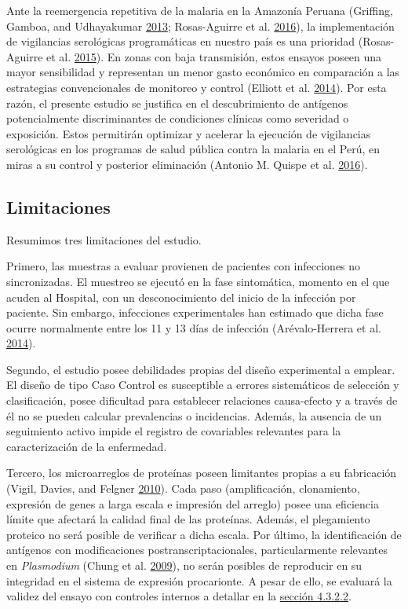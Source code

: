 \documentclass[a4paper]{article}
\begin{document}
Ante la reemergencia repetitiva de la malaria en la Amazonía Peruana
(Griffing, Gamboa, and Udhayakumar
\protect\hyperlink{ref-griffing2013history}{2013}; Rosas-Aguirre et al.
\protect\hyperlink{ref-rosas2016peru}{2016}), la implementación de
vigilancias serológicas programáticas en nuestro país es una prioridad
(Rosas-Aguirre et al. \protect\hyperlink{ref-hotspots2015}{2015}). En
zonas con baja transmisión, estos ensayos poseen una mayor sensibilidad
y representan un menor gasto económico en comparación a las estrategias
convencionales de monitoreo y control (Elliott et al.
\protect\hyperlink{ref-elliott2014}{2014}). Por esta razón, el presente
estudio se justifica en el descubrimiento de antígenos potencialmente
discriminantes de condiciones clínicas como severidad o exposición.
Estos permitirán optimizar y acelerar la ejecución de vigilancias
serológicas en los programas de salud pública contra la malaria en el
Perú, en miras a su control y posterior eliminación (Antonio M. Quispe
et al. \protect\hyperlink{ref-accelerate2016}{2016}).

\subsection{Limitaciones}\label{limit}

Resumimos tres limitaciones del estudio.

Primero, las muestras a evaluar provienen de pacientes con infecciones
no sincronizadas. El muestreo se ejecutó en la fase sintomática, momento
en el que acuden al Hospital, con un desconocimiento del inicio de la
infección por paciente. Sin embargo, infecciones experimentales han
estimado que dicha fase ocurre normalmente entre los 11 y 13 días de
infección (Arévalo-Herrera et al.
\protect\hyperlink{ref-arevalo2014}{2014}).

Segundo, el estudio posee debilidades propias del diseño experimental a
emplear. El diseño de tipo Caso Control es susceptible a errores
sistemáticos de selección y clasificación, posee dificultad para
establecer relaciones causa-efecto y a través de él no se pueden
calcular prevalencias o incidencias. Además, la ausencia de un
seguimiento activo impide el registro de covariables relevantes para la
caracterización de la enfermedad.

Tercero, los microarreglos de proteínas poseen limitantes propias a su
fabricación (Vigil, Davies, and Felgner
\protect\hyperlink{ref-vigil2010}{2010}). Cada paso (amplificación,
clonamiento, expresión de genes a larga escala e impresión del arreglo)
posee una eficiencia límite que afectará la calidad final de las
proteínas. Además, el plegamiento proteico no será posible de verificar
a dicha escala. Por último, la identificación de antígenos con
modificaciones postranscriptacionales, particularmente relevantes en
\emph{Plasmodium} (Chung et al.
\protect\hyperlink{ref-leroch2009postmod}{2009}), no serán posibles de
reproducir en su integridad en el sistema de expresión procarionte. A
pesar de ello, se evaluará la validez del ensayo con controles internos
a detallar en la \protect\hyperlink{validez}{sección 4.3.2.2}.
\end{document}
